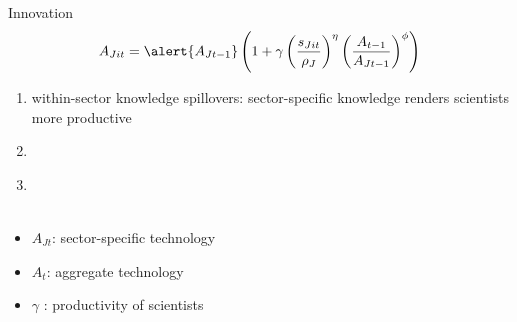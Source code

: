 \documentclass[11pt,aspectratio=169]{beamer}
\begin{document}


\begin{frame}{Innovation}
	\pause
		\vspace{-5mm}
	\large
	\begin{align*}
		A_{Jit}=\alert{A_{Jt-1}}\left(1+\gamma\left(\frac{s_{Jit}}{\rho_J}\right)^\eta\left(\frac{A_{t-1}}{A_{Jt-1}}\right)^\phi\right)
	\end{align*}
	\normalsize
	\begin{enumerate}
		\item \alert{within-sector knowledge spillovers: sector-specific knowledge renders scientists more productive} %
		\item[] \  %
		\item[] \ \\ \ %
	\end{enumerate}
	\small
	\vspace{4mm}
	\hspace{-2mm}
	\begin{minipage}[t!]{0.43\textwidth}
		\vspace{0mm}
		\begin{itemize}
			\item[] $A_{Jt}$: sector-specific technology
			\vspace{-2mm}		
			\item[] $A_t$: aggregate technology
			\vspace{-2mm}
			\item[] $\gamma$ : productivity of scientists

\end{itemize}
\end{minipage}
\end{frame}
\end{document}
